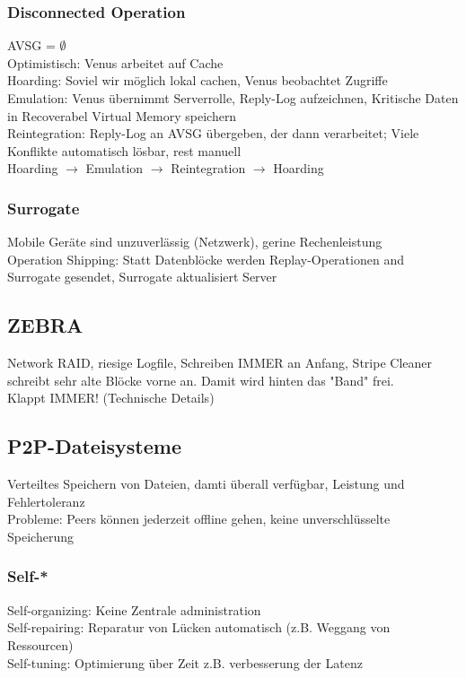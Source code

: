 \documentclass[a4paper]{article}
\begin{document}
\subsubsection{Disconnected Operation}
AVSG = $\emptyset$\\
Optimistisch: Venus arbeitet auf Cache\\
Hoarding: Soviel wir möglich lokal cachen, Venus beobachtet Zugriffe\\
Emulation: Venus übernimmt Serverrolle, Reply-Log aufzeichnen, Kritische Daten in Recoverabel Virtual Memory speichern\\
Reintegration: Reply-Log an AVSG übergeben, der dann verarbeitet; Viele Konflikte automatisch lösbar, rest manuell\\
Hoarding $\rightarrow$ Emulation $\rightarrow$ Reintegration $\rightarrow$ Hoarding\\
\subsubsection{Surrogate}
Mobile Geräte sind unzuverlässig (Netzwerk), gerine Rechenleistung\\
Operation Shipping: Statt Datenblöcke werden Replay-Operationen and Surrogate gesendet, Surrogate aktualisiert Server\\
\subsection{ZEBRA}
Network RAID, riesige Logfile, Schreiben IMMER an Anfang, Stripe Cleaner schreibt sehr alte Blöcke vorne an. Damit wird hinten das "Band" frei.\\
Klappt IMMER! (Technische Details)\\
\subsection{P2P-Dateisysteme}
Verteiltes Speichern von Dateien, damti überall verfügbar, Leistung und Fehlertoleranz\\
Probleme: Peers können jederzeit offline gehen, keine unverschlüsselte Speicherung\\
\subsubsection{Self-*}
Self-organizing: Keine Zentrale administration\\
Self-repairing: Reparatur von Lücken automatisch (z.B. Weggang von Ressourcen)\\
Self-tuning: Optimierung über Zeit z.B. verbesserung der Latenz\\
\end{document}

